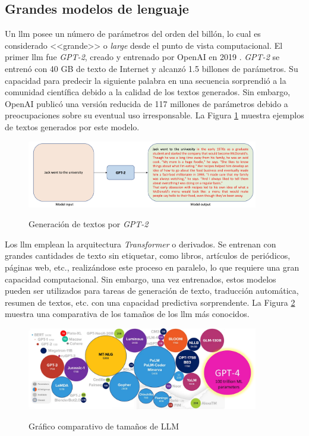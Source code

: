 \subsection{Grandes modelos de lenguaje}

Un \gls{llm} posee un número de parámetros del orden del billón, lo cual es considerado <<grande>> o \textit{large} desde el punto de vista computacional. El primer \gls{llm} fue \textit{GPT-2}, creado y entrenado por OpenAI en 2019 \citep{radfordLanguageModelsAre2019a}. \textit{GPT-2} se entrenó con 40 GB de texto de Internet y alcanzó 1.5 billones de parámetros. Su capacidad para predecir la siguiente palabra en una secuencia sorprendió a la comunidad científica debido a la calidad de los textos generados. Sin embargo, OpenAI publicó una versión reducida de 117 millones de parámetros debido a preocupaciones sobre su eventual uso irresponsable. La Figura \ref{fig:gpt2_text_generation} muestra ejemplos de textos generados por este modelo.

\begin{figure}[H]
    \caption{Generación de textos por \textit{GPT-2}}
    \centering
    \includegraphics[width=0.9\textwidth]{./figuras/GPT2_text_generation.png}
    \label{fig:gpt2_text_generation}
\end{figure}

Los \gls{llm} emplean la arquitectura \textit{Transformer} o derivados. Se entrenan con grandes cantidades de texto sin etiquetar, como libros, artículos de periódicos, páginas web, etc., realizándose este proceso en paralelo, lo que requiere una gran capacidad computacional. Sin embargo, una vez entrenados, estos modelos pueden ser utilizados para tareas de generación de texto, traducción automática, resumen de textos, etc. con una capacidad predictiva sorprendente. La Figura \ref{fig:llm_sizes} muestra una comparativa de los tamaños de los \gls{llm} más conocidos.

\begin{figure}[H]
    \caption{Gráfico comparativo de tamaños de LLM}
    \centering
    \includegraphics[width=0.9\textwidth]{./figuras/LLMs_sizes.png}
    \label{fig:llm_sizes}
\end{figure}

